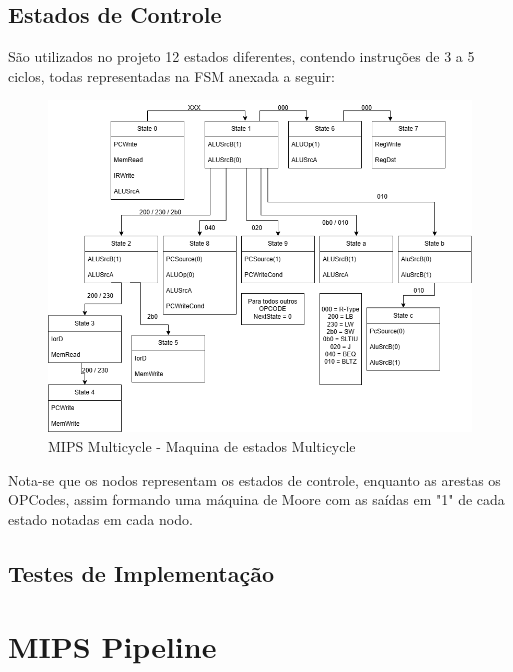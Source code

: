 \documentclass{report}
\let\oldsection\section
\renewcommand\section{\clearpage\oldsection}
\begin{document}
        \subsection{Estados de Controle}
        São utilizados no projeto 12 estados diferentes, contendo instruções de 3 a 5 ciclos, todas representadas na FSM anexada a seguir:
        \begin{figure}[h!]
            \centering
            \includegraphics[width=\linewidth]{images/prints/Multicycle/FSM Multicycle.png}
            \caption{\label{print:FSM_Multicycle} MIPS Multicycle - Maquina de estados Multicycle}
        \end{figure}
        Nota-se que os nodos representam os estados de controle, enquanto as arestas os OPCodes, assim formando uma máquina de Moore com as saídas em "1" de cada estado notadas em cada nodo.

        \subsection{Testes de Implementação}


        



    \section{MIPS Pipeline}
\end{document}
